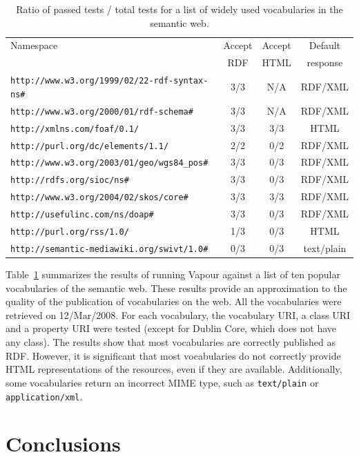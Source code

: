 \documentclass{../templates/llncs}
\begin{document}
\begin{table}
\caption{Ratio of passed tests / total tests for a list of widely used vocabularies in the semantic web.}
\centering
\begin{tabular}{lccc}
\hline
Namespace & Accept & Accept & Default \\
 & RDF & HTML & response \\
\hline\hline
\texttt{http://www.w3.org/1999/02/22-rdf-syntax-ns\#} & 3/3 & N/A & RDF/XML \\
\texttt{http://www.w3.org/2000/01/rdf-schema\#} & 3/3 & N/A & RDF/XML \\
\texttt{http://xmlns.com/foaf/0.1/} & 3/3 & 3/3 & HTML \\
\texttt{http://purl.org/dc/elements/1.1/} & 2/2 & 0/2 & RDF/XML \\
\texttt{http://www.w3.org/2003/01/geo/wgs84\_pos\#} & 3/3 & 0/3 & RDF/XML \\
\texttt{http://rdfs.org/sioc/ns\#} & 3/3 & 0/3 & RDF/XML \\
\texttt{http://www.w3.org/2004/02/skos/core\#} & 3/3 & 3/3 & RDF/XML \\
\texttt{http://usefulinc.com/ns/doap\#} & 3/3 & 0/3 & RDF/XML \\
\texttt{http://purl.org/rss/1.0/} & 1/3 & 0/3 & HTML \\
\texttt{http://semantic-mediawiki.org/swivt/1.0\#} & 0/3 & 0/3 & text/plain \\ [1ex]
\hline
\end{tabular}
\label{tab:usage}
\end{table}

Table~\ref{tab:usage} summarizes the results of running Vapour against a list of
ten popular vocabularies of the semantic web. These results provide an
approximation to the quality of the publication of vocabularies on the web. 
All the vocabularies were retrieved on 12/Mar/2008. For each vocabulary, the vocabulary URI, a class URI and a property URI were tested
(except for Dublin Core, which does not have any class). The results show that
most vocabularies are correctly published as RDF. However, it is significant that
most vocabularies do not correctly provide HTML representations of the resources, even
if they are available.
Additionally, some vocabularies return an incorrect MIME type,
such as \texttt{text/plain} or \texttt{application/xml}.

\section{\label{sec:conclusions}Conclusions}
\end{document}
